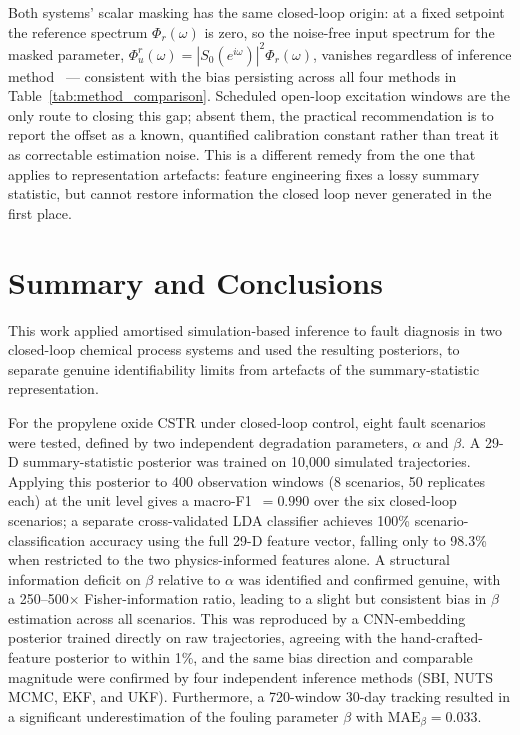 \documentclass[aps,pre,twocolumn,superscriptaddress]{revtex4-2}
\begin{document}
Both systems' scalar masking has the same closed-loop origin: at a fixed
setpoint the reference spectrum $\Phi_r(\omega)$ is zero, so the noise-free
input spectrum for the masked parameter,
$\Phi_u^r(\omega) = |S_0(e^{i\omega})|^2\Phi_r(\omega)$, vanishes regardless
of inference method~\citep{Forssell1999} --- consistent with the bias
persisting across all four methods in Table~\ref{tab:method_comparison}.
Scheduled open-loop excitation windows are the only route to closing this
gap; absent them, the practical recommendation is to report the offset as a
known, quantified calibration constant rather than treat it as correctable
estimation noise. This is a different remedy from the one that applies to
representation artefacts: feature
engineering fixes a lossy summary statistic, but cannot restore information
the closed loop never generated in the first place.

\section{Summary and Conclusions}
\label{sec:conclusions}

This work applied amortised simulation-based inference to fault diagnosis in
two closed-loop chemical process systems and used the resulting posteriors,
to separate genuine identifiability limits from artefacts of the 
summary-statistic representation.

For the propylene oxide CSTR under closed-loop control,
eight fault scenarios were tested, defined by two independent
degradation parameters, $\alpha$ and $\beta$.
A 29-D summary-statistic posterior was trained on 10,000 simulated trajectories.
Applying this posterior to 400 observation windows (8 scenarios, 50 replicates
each) at the unit level gives a macro-F1~$=0.990$ over the six closed-loop
scenarios; a separate cross-validated LDA classifier achieves 100\% scenario-classification
accuracy using the full 29-D feature vector, falling only to 98.3\% when restricted to the
two physics-informed features alone.
A structural information deficit on $\beta$ relative to $\alpha$ was identified
and confirmed genuine, with a 250--500$\times$ Fisher-information ratio,
leading to a slight but consistent bias in $\beta$
estimation across all scenarios.
This was reproduced by a CNN-embedding posterior trained directly on raw trajectories,
agreeing with the hand-crafted-feature posterior to within 1\%, and the same bias
direction and comparable magnitude were confirmed by four independent inference
methods (SBI, NUTS MCMC, EKF, and UKF).
Furthermore, a 720-window
30-day tracking resulted in a significant underestimation of the fouling parameter $\beta$ with
$\mathrm{MAE}_\beta = 0.033$.
\end{document}
